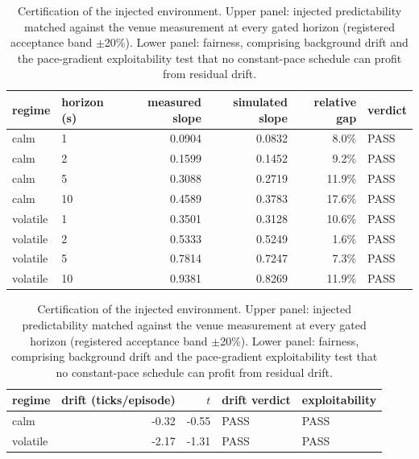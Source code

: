 \begin{table}[htbp]\centering
\caption{Certification of the injected environment. Upper panel: injected
predictability matched against the venue measurement at every gated horizon
(registered acceptance band $\pm$20\%). Lower panel: fairness, comprising background
drift and the pace-gradient exploitability test that no constant-pace schedule can
profit from residual drift.}
\label{tab:sigext-certification}
\small
\begin{tabular}{llrrrl}
\toprule
regime & horizon (s) & measured slope & simulated slope & relative gap & verdict \\
\midrule
calm & 1 & 0.0904 & 0.0832 & 8.0\% & PASS \\
calm & 2 & 0.1599 & 0.1452 & 9.2\% & PASS \\
calm & 5 & 0.3088 & 0.2719 & 11.9\% & PASS \\
calm & 10 & 0.4589 & 0.3783 & 17.6\% & PASS \\
volatile & 1 & 0.3501 & 0.3128 & 10.6\% & PASS \\
volatile & 2 & 0.5333 & 0.5249 & 1.6\% & PASS \\
volatile & 5 & 0.7814 & 0.7247 & 7.3\% & PASS \\
volatile & 10 & 0.9381 & 0.8269 & 11.9\% & PASS \\
\bottomrule
\end{tabular}

\vspace{0.6em}
\begin{tabular}{lrrll}
\toprule
regime & drift (ticks/episode) & $t$ & drift verdict & exploitability \\
\midrule
calm & -0.32 & -0.55 & PASS & PASS \\
volatile & -2.17 & -1.31 & PASS & PASS \\
\bottomrule
\end{tabular}
\end{table}
